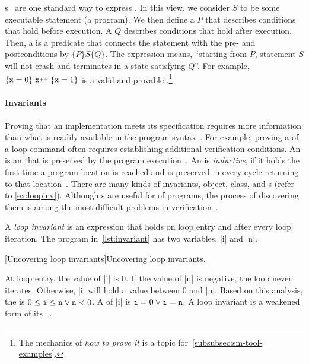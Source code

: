 s~\cite{hoare1969} are one standard way to express
. In this view, we consider \(S\) to be some executable
statement (a program). We then define a \emph{}
\(P\) that describes conditions that hold before execution. A
\emph{} \(Q\) describes conditions that hold
after execution. Then, a \emph{} is a predicate that connects
the statement with the pre- and postconditions by \(\{P\} S
\{Q\}\). The expression means, \enquote{starting from
\(P\), statement \(S\) will not crash and terminates in a state
satisfying \(Q\)}. For example, \(\{ \prm{x}=0
\}\;\prm{x++}\;\{\prm{x}=1\}\) is a valid and provable .\footnote{The mechanics of \emph{how to prove it} is a topic
for~\autoref{subsubsec:sm-tool-examples}.}

\paragraph*{Invariants}
Proving that an implementation meets its specification requires more information
than what is readily available in the program syntax~\cite{chang2005}. For
example, proving a  of a loop command often requires
establishing additional verification conditions. An \emph{} is an
 that is preserved by the program execution~\cite{furia2014}. An
 is \emph{inductive}, if it holds the
first time a program location is reached and is preserved in every cycle
returning to that location~\cite{sankaranarayanan2004}. There are many kinds of
invariants, \eg object, class,
and s (refer to \autoref{ex:loopinv}). Although
s are useful for  of programs, the
process of discovering them is among the most difficult problems in
verification~\cite{dillig2013,yu2023}.

\begin{example}\label{ex:loopinv}
A \emph{loop invariant} is an expression that holds on loop entry and after
every loop iteration. The program in~\autoref{lst:invariant} has two variables,
\pr|i| and \pr|n|.

\begin{center}
\begin{minipage}{\textwidth}
\captionsetup{type=lstlisting}
[Uncovering loop invariants]{Uncovering loop invariants.}
\label{lst:invariant}
\end{minipage}
\end{center}

At loop entry, the value of \pr|i| is 0. If the value of \pr|n| is negative, the
loop never iterates. Otherwise, \pr|i| will hold a value between 0 and \pr|n|.
Based on this analysis, the  is \(0 \leq \prm{i} \leq
\prm{n} \vee \prm{n} < 0\). A  of \pr|i| is \(\prm{i}=0 \vee
\prm{i}=\prm{n}\). A loop invariant is a {weakened} form of its
~\cite{furia2010}.
\end{example}

